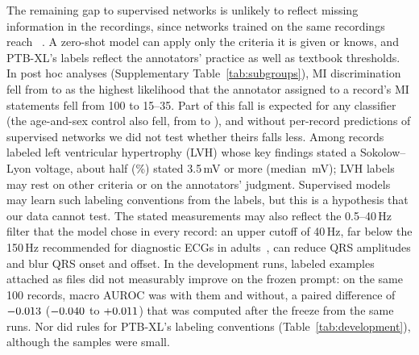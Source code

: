The remaining gap to supervised networks is unlikely to reflect missing information in the recordings, since networks
trained on the same recordings reach \BestPublishedAUROC~\citep{Strodthoff2021}. A zero-shot model can apply only the
criteria it is given or knows, and PTB-XL's labels reflect the annotators' practice as well as textbook thresholds. In
post hoc analyses (Supplementary Table~\ref{tab:subgroups}), MI discrimination fell from \PHMILikHundred{} to \PHMILikLow{} as the highest likelihood that the
annotator assigned to a record's MI statements fell from 100 to 15--35. Part of this fall is expected for any
classifier (the age-and-sex control also fell, from \PHMILikHundredAgeSex{} to \PHMILikLowAgeSex), and without
per-record predictions of supervised networks we did not test whether theirs falls less. Among records labeled left
ventricular hypertrophy (LVH) whose key findings stated a Sokolow--Lyon voltage, about half (\PHMeasLVHCodeCrit\%)
stated 3.5\,mV or more (median \PHMeasLVHCodeMedian\,mV); LVH labels may rest on other criteria or on the annotators'
judgment. Supervised models may learn such labeling conventions from the labels, but this is a hypothesis that our data
cannot test. The stated measurements may also reflect the 0.5--40\,Hz filter that the model chose in every record: an
upper cutoff of 40\,Hz, far below the 150\,Hz recommended for diagnostic ECGs in
adults~\citep{kligfield2007recommendations}, can reduce QRS amplitudes and blur QRS onset and offset. In the
development runs, labeled examples attached as files did not measurably improve on the frozen prompt: on the same
100 records, macro AUROC was \DevBoth{} with them and \DevVTwoHundred{} without, a paired difference of
$-0.013$ ($-0.040$ to $+0.011$) that was computed after the freeze from the same runs. Nor did
rules for PTB-XL's labeling conventions (Table~\ref{tab:development}), although the samples were small.

